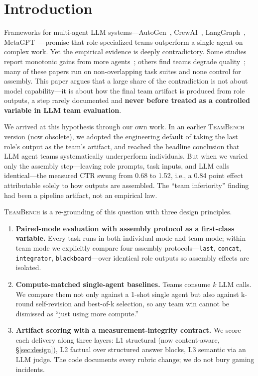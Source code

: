 \documentclass{article}
\newcommand{\teambench}{\textsc{TeamBench}}
\newcommand{\code}[1]{\texttt{#1}}
\begin{document}
\section{Introduction}
\label{sec:intro}

Frameworks for multi-agent LLM systems---AutoGen~\citep{wu2023autogen}, CrewAI~\citep{crewai2024}, LangGraph~\citep{langgraph2024}, MetaGPT~\citep{hong2024metagpt}---promise that role-specialized teams outperform a single agent on complex work. Yet the empirical evidence is deeply contradictory. Some studies report monotonic gains from more agents~\citep{li2024moreagents}; others find teams degrade quality~\citep{cemri2025masfail}; many of these papers run on non-overlapping task suites and none control for assembly. This paper argues that a large share of the contradiction is not about model capability---it is about how the final team artifact is produced from role outputs, a step rarely documented and \textbf{never before treated as a controlled variable in LLM team evaluation}.

We arrived at this hypothesis through our own work. In an earlier \teambench{} version (now obsolete), we adopted the engineering default of taking the last role's output as the team's artifact, and reached the headline conclusion that LLM agent teams systematically underperform individuals. But when we varied only the assembly step---leaving role prompts, task inputs, and LLM calls identical---the measured CTR swung from 0.68 to 1.52, i.e., a 0.84 point effect attributable solely to how outputs are assembled. The ``team inferiority'' finding had been a pipeline artifact, not an empirical law.

\teambench{} is a re-grounding of this question with three design principles.

\begin{enumerate}
\item \textbf{Paired-mode evaluation with assembly protocol as a first-class variable.} Every task runs in both individual mode and team mode; within team mode we explicitly compare four assembly protocols---\code{last}, \code{concat}, \code{integrator}, \code{blackboard}---over identical role outputs so assembly effects are isolated.
\item \textbf{Compute-matched single-agent baselines.} Teams consume $k$ LLM calls. We compare them not only against a 1-shot single agent but also against k-round self-revision and best-of-k selection, so any team win cannot be dismissed as ``just using more compute.''
\item \textbf{Artifact scoring with a measurement-integrity contract.} We score each delivery along three layers: L1 structural (now content-aware, \S\ref{sec:design}), L2 factual over structured answer blocks, L3 semantic via an LLM judge. The code documents every rubric change; we do not bury gaming incidents.
\end{enumerate}
\end{document}
